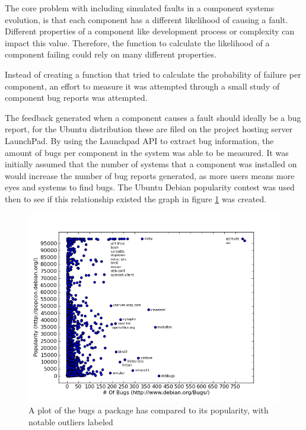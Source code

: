 The core problem with including simulated faults in a component systems evolution, is that each component has a different likelihood of causing a fault.
Different properties of a component like development process or complexity can impact this value.
Therefore, the function to calculate the likelihood of a component failing could rely on many different properties.

Instead of creating a function that tried to calculate the probability of failure per component,
an effort to measure it was attempted through a small study of component bug reports was attempted.

The feedback generated when a component causes a fault should ideally be a bug report, for the Ubuntu distribution these are filed on the project hosting server LaunchPad.
By using the Launchpad API to extract bug information, the amount of bugs per component in the system was able to be measured.
It was initially assumed that the number of systems that a component was installed on would increase the number of bug reports generated,
as more users means more eyes and systems to find bugs.
The Ubuntu Debian popularity contest was used then to see if this relationship existed the graph in figure \ref{bugsvspop} was created.

\begin{figure}[htp]
\begin{center}
  \includegraphics[width=\textwidth]{simulationpics/bugsvspopularity}
  \caption[Bugs v.s. Popularity]{A plot of the bugs a package has compared to its popularity, with notable outliers labeled}
  \label{bugsvspop}
\end{center}
\end{figure}

